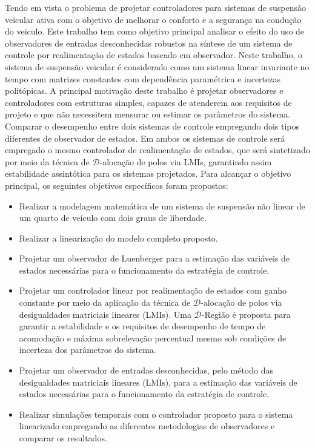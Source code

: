 Tendo em vista o problema de projetar controladores para sistemas de suspensão veicular ativa com o objetivo de melhorar o conforto e a segurança na condução do veiculo. Este trabalho tem como objetivo principal analisar o efeito do uso de observadores de entradas desconhecidas robustos na síntese de um sistema de controle por realimentação de estados baseado em observador. Neste trabalho, o sistema de suspensão veicular é considerado como um sistema linear invariante no tempo com matrizes constantes com dependência paramétrica e incertezas politópicas. 
A principal motivação deste trabalho é projetar observadores e controladores com estruturas simples, capazes de atenderem aos requisitos de projeto e que não necessitem mensurar ou estimar os parâmetros do sistema. Comparar o desempenho entre dois sistemas de controle empregando dois tipos diferentes de observador de estados. Em ambos os sistemas de controle será empregado o mesmo controlador de realimentação de estados, que será sintetizado por meio da técnica de \( \mathcal{D}\)-alocação de polos via LMIs, garantindo assim estabilidade assintótica para os sistemas projetados.
Para alcançar o objetivo principal, os seguintes objetivos específicos foram propostos:
\begin{itemize}
    \item Realizar a modelagem matemática de um sistema de suspensão não linear de um quarto de veículo com dois graus de liberdade.
    \item Realizar a linearização do modelo completo proposto.
    \item Projetar um observador de Luenberger para a estimação das variáveis de estados necessárias para o funcionamento da estratégia de controle.
    \item Projetar um controlador linear por realimentação de estados com ganho constante por meio da aplicação da técnica de \( \mathcal{D}\)-alocação de polos via desigualdades matriciais lineares (LMIs). Uma \( \mathcal{D}\)-Região é proposta para garantir a estabilidade e os requisitos de desempenho de tempo de acomodação e máxima sobrelevação percentual mesmo sob condições de incerteza dos parâmetros do sistema.
    \item Projetar um observador de entradas desconhecidas, pelo método das desigualdades matriciais lineares (LMIs), para a estimação das variáveis de estados necessárias para o funcionamento da estratégia de controle.
    \item Realizar simulações temporais com o controlador proposto para o sistema linearizado empregando as diferentes metodologias de observadores e comparar os resultados.
\end{itemize}